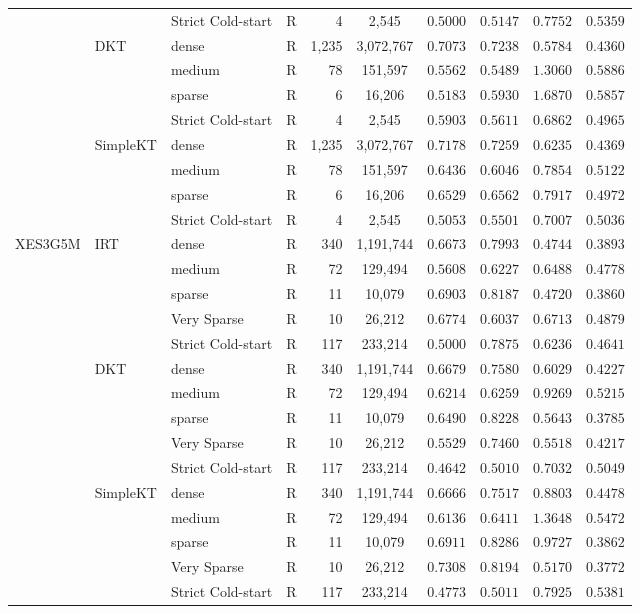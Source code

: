 \begin{table}[htbp]
{\begin{tabular}{lllcrccccc}
 &  & Strict Cold-start & R & 4 & 2,545 & $0.5000$ & $0.5147$ & $0.7752$ & $0.5359$ \\
 & DKT & dense & R & 1,235 & 3,072,767 & $0.7073$ & $0.7238$ & $0.5784$ & $0.4360$ \\
 &  & medium & R & 78 & 151,597 & $0.5562$ & $0.5489$ & $1.3060$ & $0.5886$ \\
 &  & sparse & R & 6 & 16,206 & $0.5183$ & $0.5930$ & $1.6870$ & $0.5857$ \\
 &  & Strict Cold-start & R & 4 & 2,545 & $0.5903$ & $0.5611$ & $0.6862$ & $0.4965$ \\
 & SimpleKT & dense & R & 1,235 & 3,072,767 & $0.7178$ & $0.7259$ & $0.6235$ & $0.4369$ \\
 &  & medium & R & 78 & 151,597 & $0.6436$ & $0.6046$ & $0.7854$ & $0.5122$ \\
 &  & sparse & R & 6 & 16,206 & $0.6529$ & $0.6562$ & $0.7917$ & $0.4972$ \\
 &  & Strict Cold-start & R & 4 & 2,545 & $0.5053$ & $0.5501$ & $0.7007$ & $0.5036$ \\
\midrule
XES3G5M & IRT & dense & R & 340 & 1,191,744 & $0.6673$ & $0.7993$ & $0.4744$ & $0.3893$ \\
 &  & medium & R & 72 & 129,494 & $0.5608$ & $0.6227$ & $0.6488$ & $0.4778$ \\
 &  & sparse & R & 11 & 10,079 & $0.6903$ & $0.8187$ & $0.4720$ & $0.3860$ \\
 &  & Very Sparse & R & 10 & 26,212 & $0.6774$ & $0.6037$ & $0.6713$ & $0.4879$ \\
 &  & Strict Cold-start & R & 117 & 233,214 & $0.5000$ & $0.7875$ & $0.6236$ & $0.4641$ \\
 & DKT & dense & R & 340 & 1,191,744 & $0.6679$ & $0.7580$ & $0.6029$ & $0.4227$ \\
 &  & medium & R & 72 & 129,494 & $0.6214$ & $0.6259$ & $0.9269$ & $0.5215$ \\
 &  & sparse & R & 11 & 10,079 & $0.6490$ & $0.8228$ & $0.5643$ & $0.3785$ \\
 &  & Very Sparse & R & 10 & 26,212 & $0.5529$ & $0.7460$ & $0.5518$ & $0.4217$ \\
 &  & Strict Cold-start & R & 117 & 233,214 & $0.4642$ & $0.5010$ & $0.7032$ & $0.5049$ \\
 & SimpleKT & dense & R & 340 & 1,191,744 & $0.6666$ & $0.7517$ & $0.8803$ & $0.4478$ \\
 &  & medium & R & 72 & 129,494 & $0.6136$ & $0.6411$ & $1.3648$ & $0.5472$ \\
 &  & sparse & R & 11 & 10,079 & $0.6911$ & $0.8286$ & $0.9727$ & $0.3862$ \\
 &  & Very Sparse & R & 10 & 26,212 & $0.7308$ & $0.8194$ & $0.5170$ & $0.3772$ \\
 &  & Strict Cold-start & R & 117 & 233,214 & $0.4773$ & $0.5011$ & $0.7925$ & $0.5381$ \\
\bottomrule


\end{tabular}}
\end{table}
